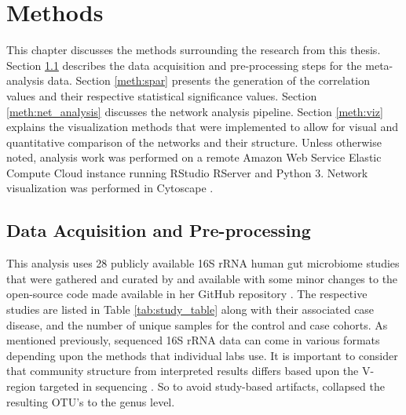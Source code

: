
\chapter{Methods}\label{chap-meth}


This chapter discusses the methods surrounding the research from this thesis. Section \ref{sec:meth-avail} describes the data acquisition and pre-processing steps for the meta-analysis data. 
Section \ref{meth:spar} presents the generation of the correlation values and their respective statistical significance values. Section \ref{meth:net_analysis} discusses the network analysis pipeline. Section \ref{meth:viz} explains the visualization methods that were implemented to allow for visual and quantitative comparison of the networks and their structure. Unless otherwise noted, analysis work was performed on a remote Amazon Web Service Elastic Compute Cloud instance running RStudio RServer and Python 3.  Network visualization was performed in Cytoscape \citep{Shannon2003_cytoscape}.


\section{Data Acquisition and Pre-processing}\label{sec:meth-avail}
This analysis uses 28 publicly available 16S \acrshort{rRNA} human gut microbiome studies that were gathered and curated by \cite{Duvallet2017} and available with some minor changes to the open-source code made available in her GitHub repository \citep{Duvallet2018}. The respective studies are listed in Table \ref{tab:study_table} along with their associated case disease, and the number of unique samples for the control and case cohorts. As mentioned previously, sequenced 16S \acrshort{rRNA} data can come in various formats depending upon the methods that individual labs use. It is important to consider that community structure from interpreted results differs based upon the V-region targeted in sequencing \citep{Teng2018}. So to avoid study-based artifacts, \citeauthor{Duvallet2017} collapsed the resulting \acrshort{OTU}'s to the genus level. 

